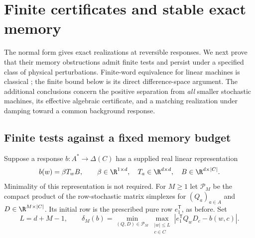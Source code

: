\section{Finite certificates and stable exact memory}\label{sec:r73-finite-certificates}

The normal form gives exact realizations at reversible responses. We next prove
that their memory obstructions admit finite tests and persist under a specified
class of physical perturbations. Finite-word equivalence for linear machines is
classical \cite{Tzeng92}; the finite bound below is its direct difference-space
argument. The additional conclusions concern the positive separation from
\emph{all} smaller stochastic machines, its effective algebraic certificate,
and a matching realization under damping toward a common background response.

\subsection{Finite tests against a fixed memory budget}
Suppose a response $b:A^*\to\Delta(C)$ has a supplied real linear representation
\[
 b(w)=\beta T_w B,
 \qquad \beta\in\R^{1\times d},\quad T_a\in\R^{d\times d},
 \quad B\in\R^{d\times |C|}.
\]
Minimality of this representation is not required. For $M\ge1$ let
$\mathcal P_M$ be the compact product of the row-stochastic matrix simplexes
for $(Q_a)_{a\in A}$ and $D\in\R^{M\times |C|}$. Its initial row is the
prescribed pure row $e_1^{\mathsf T}$, as before. Set
\begin{equation}\label{eq:r73-finite-gap}
 L=d+M-1,\qquad
 \delta_M(b)=\min_{(Q,D)\in\mathcal P_M}
 \max_{\substack{|w|\le L\\c\in C}}
 \left|e_1^{\mathsf T}Q_wD_c-b(w,c)\right|.
\end{equation}

